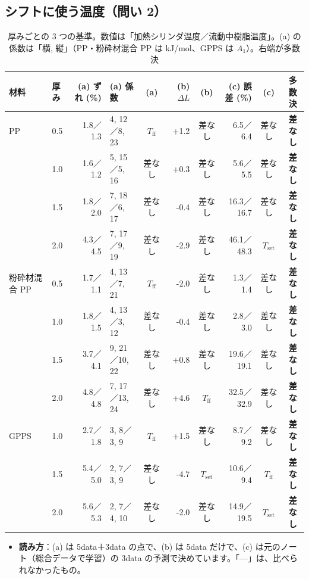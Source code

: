 \documentclass[paper=a4paper,fontsize=10.5pt,line_length=44zw,number_of_lines=38]{jlreq}
\newcommand{\Tff}{T_{\mathrm{ff}}}
\newcommand{\Tset}{T_{\mathrm{set}}}
\newenvironment{points}{\begin{itemize}[label=$\triangleright$,leftmargin=1.5\zw,itemsep=0.3ex,topsep=0.5ex,parsep=0pt]}{\end{itemize}}
\newcommand{\pt}[1]{\item \textbf{#1}：}
\begin{document}
\subsection{シフトに使う温度（問い 2）}
\begin{table}[H]
\caption{厚みごとの 3 つの基準。数値は「加熱シリンダ温度／流動中樹脂温度」。(a) の係数は「横, 縦」（PP・粉砕材混合 PP は kJ/mol、GPPS は $A_1$）。右端が多数決}\label{tab:win}
\scriptsize
\begin{tabularx}{\linewidth}{@{}llrXcrcrcc@{}}
\toprule
材料 & 厚み & (a) ずれ (\%) & (a) 係数 & (a) & (b) $\Delta L$ & (b) & (c) 誤差 (\%) & (c) & 多数決 \\
\midrule
PP & 0.5 & 1.8／1.3 & 4, 12／8, 23 & $\Tff$ & +1.2 & 差なし & 6.5／6.4 & 差なし & \textbf{差なし} \\
 & 1.0 & 1.6／1.2 & 5, 15／5, 16 & 差なし & +0.3 & 差なし & 5.6／5.5 & 差なし & \textbf{差なし} \\
 & 1.5 & 1.8／2.0 & 7, 18／6, 17 & 差なし & -0.4 & 差なし & 16.3／16.7 & 差なし & \textbf{差なし} \\
 & 2.0 & 4.3／4.5 & 7, 17／9, 19 & 差なし & -2.9 & 差なし & 46.1／48.3 & $\Tset$ & \textbf{差なし} \\
\midrule
粉砕材混合 PP & 0.5 & 1.7／1.1 & 4, 13／7, 21 & $\Tff$ & -2.0 & 差なし & 1.3／1.4 & 差なし & \textbf{差なし} \\
 & 1.0 & 1.8／1.5 & 4, 13／3, 12 & 差なし & -0.4 & 差なし & 2.8／3.0 & 差なし & \textbf{差なし} \\
 & 1.5 & 3.7／4.1 & 9, 21／10, 22 & 差なし & +0.8 & 差なし & 19.6／19.1 & 差なし & \textbf{差なし} \\
 & 2.0 & 4.8／4.8 & 7, 17／13, 24 & 差なし & +4.6 & $\Tff$ & 32.5／32.9 & 差なし & \textbf{差なし} \\
\midrule
GPPS & 1.0 & 2.7／1.8 & 3, 8／3, 9 & $\Tff$ & +1.5 & 差なし & 8.7／9.2 & 差なし & \textbf{差なし} \\
 & 1.5 & 5.4／5.0 & 2, 7／3, 9 & 差なし & -4.7 & $\Tset$ & 10.6／9.4 & $\Tff$ & \textbf{差なし} \\
 & 2.0 & 5.6／5.3 & 2, 7／4, 10 & 差なし & -2.0 & 差なし & 14.9／19.5 & $\Tset$ & \textbf{差なし} \\

\bottomrule
\end{tabularx}
\end{table}
\begin{points}
\pt{読み方}(a) は 5data＋3data の点で、(b) は 5data だけで、(c) は元のノート（総合データで学習）の 3data の予測で決めています。「—」は、比べられなかったもの。
\end{points}
\end{document}
